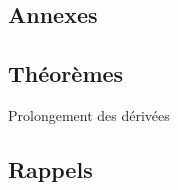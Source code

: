 \begin{subappendices}
\section{Annexes}
\subsection{Théorèmes}
\begin{theo}{Prolongement des dérivées}\label{thm:prolongementDesDerivees}

\end{theo}
\subsection{Rappels}
\end{subappendices}